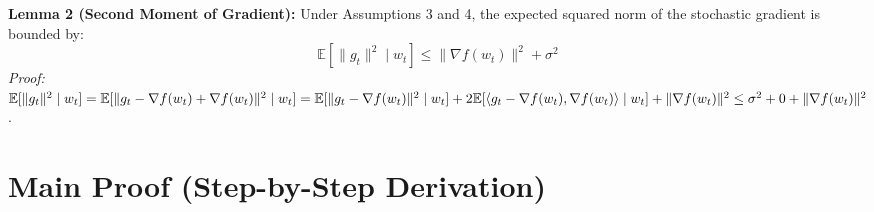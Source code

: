 \documentclass[11pt]{article}
\begin{document}
\textbf{Lemma 2 (Second Moment of Gradient):} Under Assumptions 3 and 4, the expected squared norm of the stochastic gradient is bounded by:
$$\mathbb{E}[\|g_t\|^2 \mid w_t] \leq \|\nabla f(w_t)\|^2 + \sigma^2$$
\textit{Proof:}
$\mathbb{E}[\|g_t\|^2 \mid w_t] = \mathbb{E}[\|g_t - \nabla f(w_t) + \nabla f(w_t)\|^2 \mid w_t] \\
= \mathbb{E}[\|g_t - \nabla f(w_t)\|^2 \mid w_t] + 2\mathbb{E}[\langle g_t - \nabla f(w_t), \nabla f(w_t) \rangle \mid w_t] + \|\nabla f(w_t)\|^2 \\
\leq \sigma^2 + 0 + \|\nabla f(w_t)\|^2$.

\section*{Main Proof (Step-by-Step Derivation)}
\end{document}
